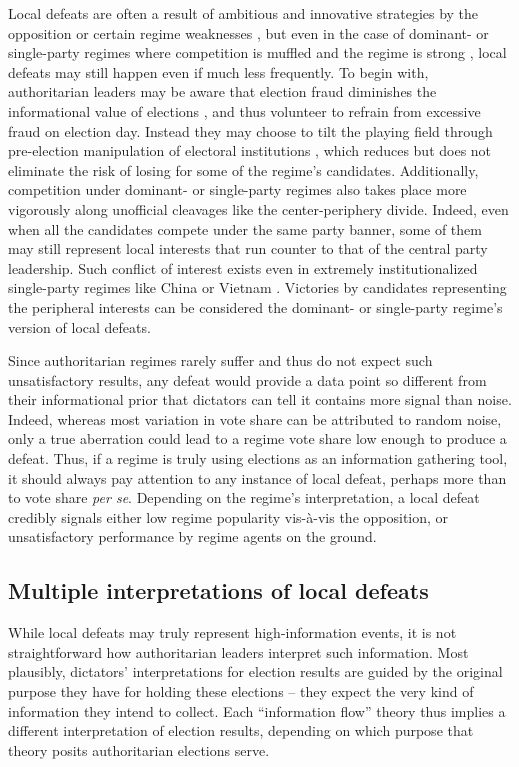 \documentclass[12pt]{article}\usepackage[]{graphicx}\usepackage[]{color}
\newcommand{\1}{\mathbbm{1}}
\begin{document}
Local defeats are often a result of ambitious and innovative strategies by the opposition \citep{BunceWolchik2010} or certain regime weaknesses \citep{LevistkyWay2010}, but even in the case of dominant- or single-party regimes where competition is muffled \citep{Schedler2002} and the regime is strong \citep{BunceWolchik2010}, local defeats may still happen even if much less frequently. To begin with, authoritarian leaders may be aware that election fraud diminishes the informational value of elections \citep{Wintrobe2000}, and thus volunteer to refrain from excessive fraud on election day. Instead they may choose to tilt the playing field through pre-election manipulation of electoral institutions \citep{DiazMagaloni2001, Pepinsky2009, MaleskySchuler2011}, which reduces but does not eliminate the risk of losing for some of the regime's candidates. Additionally, competition under dominant- or single-party regimes also takes place more vigorously along unofficial cleavages like the center-periphery divide. Indeed, even when all the candidates compete under the same party banner, some of them may still represent local interests that run counter to that of the central party leadership. Such conflict of interest exists even in extremely institutionalized single-party regimes like China \citep{Manion2014} or Vietnam \citep{MaleskySchuler2011}. Victories by candidates representing the peripheral interests can be considered the dominant- or single-party regime's version of local defeats.
	
Since authoritarian regimes rarely suffer and thus do not expect such unsatisfactory results, any defeat would provide a data point so different from their informational prior that dictators can tell it contains more signal than noise. Indeed, whereas most variation in vote share can be attributed to random noise, only a true aberration could lead to a regime vote share low enough to produce a defeat. Thus, if a regime is truly using elections as an information gathering tool, it should always pay attention to any instance of local defeat, perhaps more than to vote share \textit{per se}. Depending on the regime's interpretation, a local defeat credibly signals either low regime popularity vis-\`{a}-vis the opposition, or unsatisfactory performance by regime agents on the ground.

\subsection{Multiple interpretations of local defeats}
While local defeats may truly represent high-information events, it is not straightforward how authoritarian leaders interpret such information. Most plausibly, dictators' interpretations for election results are guided by the original purpose they have for holding these elections -- they expect the very kind of information they intend to collect. Each ``information flow'' theory thus implies a different interpretation of election results, depending on which purpose that theory posits authoritarian elections serve.
\end{document}

